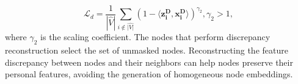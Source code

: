 \documentclass[sigconf]{acmart}
\begin{document}
\begin{equation}
\mathcal{L}_d =\frac{1}{|\hat{V}|} \sum \limits_{i \notin \hat{|V|}} (1- 
⟨\mathbf{z_i^D} ,\mathbf{x_i^D}⟩)^{\gamma_2}, \gamma_2 > 1 ,
 \label{eq.12}
\end{equation}
where $\gamma_2$ is the scaling coefficient. The nodes that perform discrepancy reconstruction select the set of unmasked nodes. Reconstructing the feature discrepancy between nodes and their neighbors can help nodes preserve their personal features, avoiding the generation of homogeneous node embeddings. 
\end{document}
